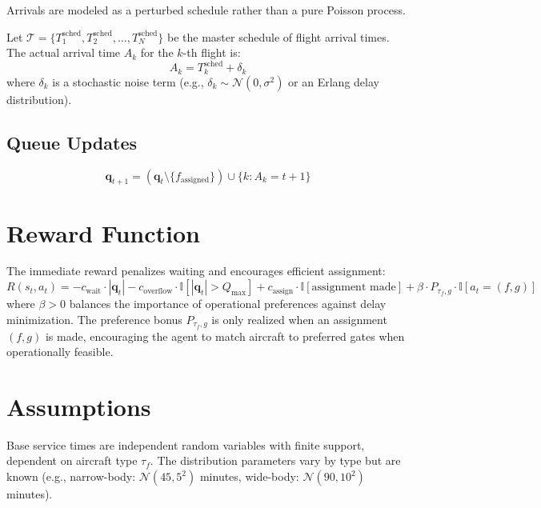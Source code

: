 Arrivals are modeled as a perturbed schedule rather than a pure Poisson process.

\noindent Let $\mathcal{T} = \{T_1^{\text{sched}}, T_2^{\text{sched}}, \ldots, T_N^{\text{sched}}\}$ be the master schedule of flight arrival times. The actual arrival time $A_k$ for the $k$-th flight is:
%
\begin{equation}
	A_k = T_k^{\text{sched}} + \delta_k
\end{equation}
%
where $\delta_k$ is a stochastic noise term (e.g., $\delta_k \sim \mathcal{N}(0, \sigma^2)$ or an Erlang delay distribution).

\subsection{Queue Updates}

\begin{equation}
	\mathbf{q}_{t+1} = (\mathbf{q}_t \setminus \{f_{\text{assigned}}\}) \cup \{k : A_k = t+1\}
\end{equation}

\section{Reward Function}

The immediate reward penalizes waiting and encourages efficient assignment:
%
\begin{equation}
	R(s_t, a_t) = -c_{\text{wait}} \cdot |\mathbf{q}_t| 
	- c_{\text{overflow}} \cdot \mathbb{I}[|\mathbf{q}_t| > Q_{\max}] 
	+ c_{\text{assign}} \cdot \mathbb{I}[\text{assignment made}]
	+ \beta \cdot P_{\tau_f, g} \cdot \mathbb{I}[a_t = (f,g)]
\end{equation}
where $\beta > 0$ balances the importance of operational preferences against 
delay minimization. The preference bonus $P_{\tau_f, g}$ is only realized when 
an assignment $(f,g)$ is made, encouraging the agent to match aircraft to 
preferred gates when operationally feasible.

\section{Assumptions}

\begin{assumption}
	Base service times are independent random variables with finite support, 
	dependent on aircraft type $\tau_f$. The distribution parameters vary by 
	type but are known (e.g., narrow-body: $\mathcal{N}(45, 5^2)$ minutes, 
	wide-body: $\mathcal{N}(90, 10^2)$ minutes).
\end{assumption}

